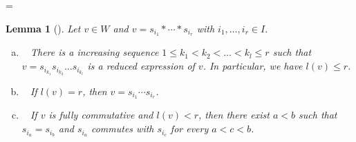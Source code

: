 \documentclass[10pt]{amsart}
\newtheorem{lemm}[theo]{Lemma}
\theoremstyle{definition}
\theoremstyle{remark}
\begin{document}
\setbox\toto=\hbox{\cite[Lemma~3.1 and Proposition~3.4]{GK}}
\begin{lemm}[\box\toto]
\label{lem:red}
Let $v \in W$ and $v = s_{i_1} * \cdots * s_{i_r}$ with $i_1, \dots, i_r \in I$.
\begin{enumerate}[(a)]
\item~\label{lemma3.12_a} %
There is a increasing sequence $1 \le k_1 < k_2 < \dots < k_l \le r$ such that 
$v = s_{i_{k_1}} s_{i_{k_2}} \dots s_{i_{k_l}}$ is a reduced expression of $v$.
In particular, we have $l(v) \le r$.
\item~\label{lemma3.12_b} %
If $l(v) = r$, then $v = s_{i_1} \cdots s_{i_r}$.
\item~\label{lemma3.12_c} %
If $v$ is fully commutative and $l(v) < r$, 
then there exist $a < b$ such that $s_{i_a} = s_{i_b}$ and
$s_{i_a}$ commutes with $s_{i_c}$ for every $a < c < b$.
\end{enumerate}
\end{lemm}
\end{document}
